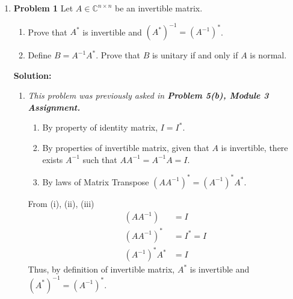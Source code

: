 \documentclass{uofa-eng-assignment}
\begin{document}
\maketitle

\begin{enumerate}
									
	\item[] \textbf{Problem 1} \newline
	      Let $A\in \mathbb{C}^{n\times n}$ be an invertible matrix.
	      \begin{enumerate}
	      	\item Prove that $A^*$ is invertible and $(A^*)^{-1} = (A^{-1})^*$.
	      	\item Define $B = A^{-1}A^*$. Prove that $B$ is unitary if and only if $A$ is normal.
	      \end{enumerate}
	      \textbf{Solution:}
	      \begin{enumerate}
	      	\item \textit{This problem was previously asked in \textbf{Problem 5(b), Module 3 Assignment.}}
	      	      \begin{enumerate}
	      	      	\item By property of identity matrix, $I = I^*$.
	      	      	\item By properties of invertible matrix, given that $A$ is invertible, there exists $A^{-1}$ such that $AA^{-1} = A^{-1}A = I$.
	      	      	\item By laws of Matrix Transpose $(AA^{-1})^* =  (A^{-1})^*A^*$.
	      	      \end{enumerate}
	      	      From (i), (ii), (iii)
	      	      \begin{align*}
	      	      	(AA^{-1})     & = I       \\
	      	      	(AA^{-1})^*   & = I^* = I \\
	      	      	(A^{-1})^*A^* & = I       
	      	      \end{align*}
	      	      Thus, by definition of invertible matrix, $A^*$ is invertible  and $(A^*)^{-1} = (A^{-1})^*$. \\
	      	                 

\end{enumerate}
\end{enumerate}
\end{document}
